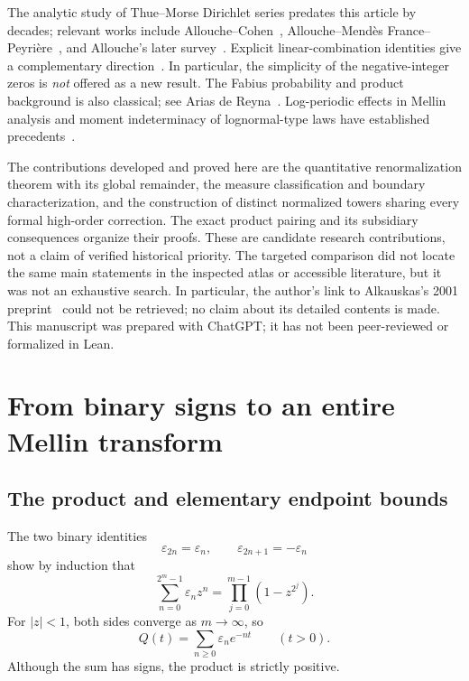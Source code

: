 \documentclass[11pt,letterpaper]{article}
\numberwithin{equation}{section}
\theoremstyle{definition}
\theoremstyle{remark}
\newcommand{\eps}{\varepsilon}
\begin{document}
The analytic study of Thue--Morse Dirichlet series predates this article by
decades; relevant works include Allouche--Cohen~\cite{AC},
Allouche--Mend\`es France--Peyri\`ere~\cite{AMP}, and
Allouche's later survey~\cite{Allouche2015}. Explicit linear-combination
identities give a complementary direction~\cite{Toth}.
In particular, the simplicity of the negative-integer zeros is
\emph{not} offered as a new result.
The Fabius probability and product background is also classical; see
Arias de Reyna~\cite{Arias}.
Log-periodic effects in Mellin analysis and moment indeterminacy of
lognormal-type laws have established precedents~\cite{FGD,Heyde}.

The contributions developed and proved here are the quantitative
renormalization theorem with its global remainder, the measure
classification and boundary characterization, and the construction of
distinct normalized towers sharing every formal high-order correction.
The exact product pairing and its subsidiary consequences organize their
proofs. These are candidate research contributions, not a claim of verified
historical priority. The targeted comparison did not locate the same main
statements in the inspected atlas or accessible literature, but it was not
an exhaustive search. In particular, the author's link to
Alkauskas's 2001 preprint~\cite{Alkauskas} could not be retrieved; no claim
about its detailed contents is made. This manuscript was prepared with
ChatGPT; it has not been peer-reviewed or formalized in Lean.

\section{From binary signs to an entire Mellin transform}\label{sec:background}

\subsection{The product and elementary endpoint bounds}
The two binary identities
\begin{equation}\label{eq:binary}
 \eps_{2n}=\eps_n,\qquad \eps_{2n+1}=-\eps_n
\end{equation}
show by induction that
\begin{equation}\label{eq:finiteproduct}
 \sum_{n=0}^{2^m-1}\eps_n z^n
   =\prod_{j=0}^{m-1}(1-z^{2^j}).
\end{equation}
For $|z|<1$, both sides converge as $m\to\infty$, so
\begin{equation}\label{eq:Qgenerating}
 Q(t)=\sum_{n\ge0}\eps_n e^{-nt}\qquad(t>0).
\end{equation}
Although the sum has signs, the product is strictly positive.
\end{document}
